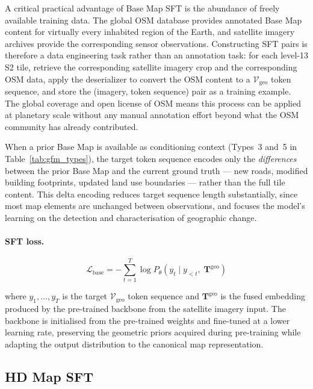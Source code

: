\documentclass{book}
\begin{document}
A critical practical advantage of Base Map SFT is the
abundance of freely available training data.  The global
OSM database provides annotated Base Map content for
virtually every inhabited region of the Earth, and satellite
imagery archives provide the corresponding sensor
observations.  Constructing SFT pairs is therefore a data
engineering task rather than an annotation task: for each
level-13 S2 tile, retrieve the corresponding satellite
imagery crop and the corresponding OSM data, apply the
deserializer to convert the OSM content to a
$\mathcal{V}_{\text{geo}}$ token sequence, and store the
(imagery, token sequence) pair as a training example.  The
global coverage and open license of OSM means this process
can be applied at planetary scale without any manual
annotation effort beyond what the OSM community has already
contributed.

When a prior Base Map is available as conditioning context
(Types~3 and~5 in Table~\ref{tab:gfm_types}), the target
token sequence encodes only the \emph{differences} between
the prior Base Map and the current ground truth --- new
roads, modified building footprints, updated land use
boundaries --- rather than the full tile content.  This
delta encoding reduces target sequence length substantially,
since most map elements are unchanged between observations,
and focuses the model's learning on the detection and
characterisation of geographic change.

\paragraph{SFT loss.}

\begin{equation}
  \mathcal{L}_{\text{base}} =
    -\sum_{t=1}^{T}
    \log P_\theta\!\left(
      y_t \mid y_{<t},\;
      \mathbf{T}^{\text{geo}}
    \right)
  \label{eq:basemap_sft_loss}
\end{equation}

where $y_1, \ldots, y_T$ is the target $\mathcal{V}_{\text{geo}}$
token sequence and $\mathbf{T}^{\text{geo}}$ is the fused
embedding produced by the pre-trained backbone from the
satellite imagery input.  The backbone is initialised from
the pre-trained weights and fine-tuned at a lower learning
rate, preserving the geometric priors acquired during
pre-training while adapting the output distribution to the
canonical map representation.

\subsection{HD Map SFT}
\label{sec:hdmap_sft}
\end{document}
